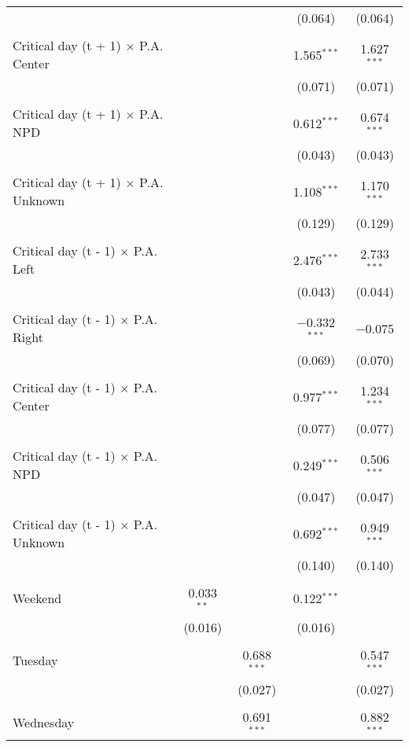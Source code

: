 \documentclass[
]{article}
\begin{document}
\begin{table}[!htbp]
{\begin{tabular}{@{\extracolsep{5pt}}lcccc}
  &  &  & (0.064) & (0.064) \\ 
  & & & & \\ 
 Critical day (t + 1) $\times$ P.A. Center &  &  & 1.565$^{***}$ & 1.627$^{***}$ \\ 
  &  &  & (0.071) & (0.071) \\ 
  & & & & \\ 
 Critical day (t + 1) $\times$ P.A. NPD &  &  & 0.612$^{***}$ & 0.674$^{***}$ \\ 
  &  &  & (0.043) & (0.043) \\ 
  & & & & \\ 
 Critical day (t + 1) $\times$ P.A. Unknown &  &  & 1.108$^{***}$ & 1.170$^{***}$ \\ 
  &  &  & (0.129) & (0.129) \\ 
  & & & & \\ 
 Critical day (t - 1) $\times$ P.A. Left &  &  & 2.476$^{***}$ & 2.733$^{***}$ \\ 
  &  &  & (0.043) & (0.044) \\ 
  & & & & \\ 
 Critical day (t - 1) $\times$ P.A. Right &  &  & $-$0.332$^{***}$ & $-$0.075 \\ 
  &  &  & (0.069) & (0.070) \\ 
  & & & & \\ 
 Critical day (t - 1) $\times$ P.A. Center &  &  & 0.977$^{***}$ & 1.234$^{***}$ \\ 
  &  &  & (0.077) & (0.077) \\ 
  & & & & \\ 
 Critical day (t - 1) $\times$ P.A. NPD &  &  & 0.249$^{***}$ & 0.506$^{***}$ \\ 
  &  &  & (0.047) & (0.047) \\ 
  & & & & \\ 
 Critical day (t - 1) $\times$ P.A. Unknown &  &  & 0.692$^{***}$ & 0.949$^{***}$ \\ 
  &  &  & (0.140) & (0.140) \\ 
  & & & & \\ 
 Weekend & 0.033$^{**}$ &  & 0.122$^{***}$ &  \\ 
  & (0.016) &  & (0.016) &  \\ 
  & & & & \\ 
 Tuesday &  & 0.688$^{***}$ &  & 0.547$^{***}$ \\ 
  &  & (0.027) &  & (0.027) \\ 
  & & & & \\ 
 Wednesday &  & 0.691$^{***}$ &  & 0.882$^{***}$ \\ 

\end{tabular}}
\end{table}
\end{document}

